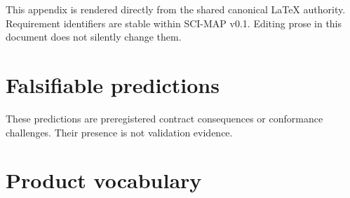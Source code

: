 \documentclass[10pt]{article}
\begin{document}
This appendix is rendered directly from the shared canonical LaTeX authority.
Requirement identifiers are stable within SCI-MAP v0.1. Editing prose in this
document does not silently change them.

\renewcommand{\SCIMapRequirement}[4]{%
  \phantomsection\label{req:#1}%
  \noindent\textbf{\textcolor{MapNavy}{#1} -- #2.} #3\par\smallskip}
\SCIMapRequirements

\clearpage
\section{Falsifiable predictions}\label{app:predictions}

These predictions are preregistered contract consequences or conformance
challenges. Their presence is not validation evidence.

\renewcommand{\SCIMapPrediction}[4]{%
  \phantomsection\label{pred:#1}%
  \noindent\textbf{\textcolor{MapNavy}{#1} -- #2.} #3
  \textit{Primary claim layer: #4.}\par\smallskip}
\SCIMapPredictions

\clearpage
\section{Product vocabulary}
\end{document}
